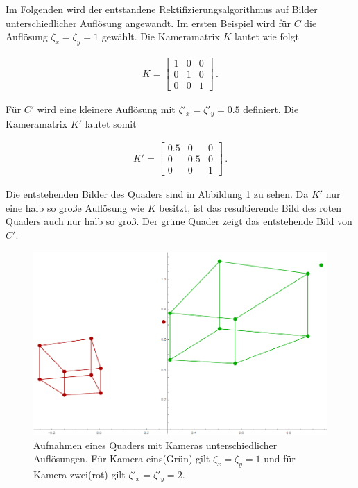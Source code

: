 Im Folgenden wird der entstandene Rektifizierungsalgorithmus auf Bilder unterschiedlicher Auflösung angewandt. Im ersten Beispiel wird für $C$ die Auflösung $\zeta_x = \zeta_y =1$ gewählt. Die Kameramatrix $K$ lautet wie folgt


\begin{gather}
	K = 
	\begin{bmatrix}
	1&0&0\\
	0&1&0\\
	0&0&1
	\end{bmatrix} \, .
\end{gather}

Für $C'$ wird eine kleinere Auflösung mit $\zeta'_x = \zeta'_y = 0.5$ definiert. Die Kameramatrix $K'$ lautet somit

\begin{gather}
K' = 
	\begin{bmatrix}
	0.5&0&0\\
	0&0.5&0\\
	0&0&1
	\end{bmatrix} \, .
\end{gather} 


Die entstehenden Bilder des Quaders sind in Abbildung \ref{fig:AbbRecDifRes} zu sehen. Da $K'$ nur eine halb so große Auflösung wie $K$ besitzt, ist das resultierende Bild des roten Quaders auch nur halb so groß. Der grüne Quader zeigt das entstehende Bild von $C'$.
\pagebreak

\begin{figure}[!htb]
	\centering
	\includegraphics[width=.8\linewidth]{images/Rectification_one_different_Solutions.png}
	\caption[Virtuelle Aufnahme mit unterschiedlichen Auflösung für die Rektifizierung]{Aufnahmen eines Quaders mit Kameras unterschiedlicher Auflösungen. Für Kamera eins(Grün) gilt \ensuremath{\zeta_x = \zeta_y = 1}  und für Kamera zwei(rot) gilt \ensuremath{\zeta'_x = \zeta'_y= 2}.} 
	\label{fig:AbbRecDifRes}
\end{figure}


